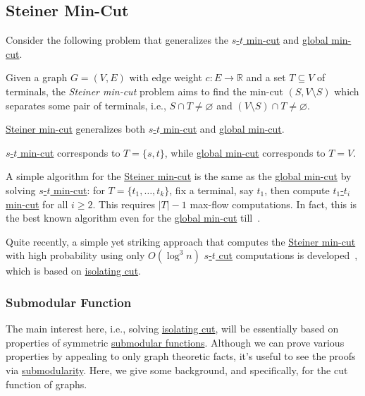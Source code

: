 \subsection{Steiner Min-Cut}
Consider the following problem that generalizes the \hyperref[prb:s-t-min-cut]{\(s\)-\(t\) min-cut} and \hyperref[prb:global-min-cut]{global min-cut}.

\begin{problem}\label{prb:Steiner-min-cut}
Given a graph \(G = (V, E)\) with edge weight \(c \colon E \to \mathbb{R} \) and a set \(T \subseteq V\) of terminals, the \emph{Steiner min-cut} problem aims to find the min-cut \((S, V\setminus S)\) which separates some pair of terminals, i.e., \(S \cap T \neq \varnothing \) and \((V \setminus S) \cap T \neq \varnothing \).
\end{problem}

\begin{remark}
	\hyperref[prb:Steiner-min-cut]{Steiner min-cut} generalizes both \hyperref[prb:s-t-min-cut]{\(s\)-\(t\) min-cut} and \hyperref[prb:global-min-cut]{global min-cut}.
\end{remark}
\begin{explanation}
	\hyperref[prb:s-t-min-cut]{\(s\)-\(t\) min-cut} corresponds to \(T = \{ s, t \} \), while \hyperref[prb:global-min-cut]{global min-cut} corresponds to \(T = V\).
\end{explanation}

A simple algorithm for the \hyperref[prb:Steiner-min-cut]{Steiner min-cut} is the same as the \hyperref[prb:global-min-cut]{global min-cut} by solving \hyperref[prb:s-t-min-cut]{\(s\)-\(t\) min-cut}: for \(T = \{ t_1, \dots , t_k \} \), fix a terminal, say \(t_1\), then compute \hyperref[prb:s-t-min-cut]{\(t_1\)-\(t_i\) min-cut} for all \(i \geq 2\). This requires \(\lvert T \rvert - 1\) max-flow computations. In fact, this is the best known algorithm even for the \hyperref[prb:global-min-cut]{global min-cut} till~\cite{nagamochi1992computing}.

Quite recently, a simple yet striking approach that computes the \hyperref[prb:Steiner-min-cut]{Steiner min-cut} with high probability using only \(O(\log ^3 n)\) \hyperref[prb:s-t-min-cut]{\(s\)-\(t\) cut} computations is developed~\cite{li2020deterministic}, which is based on \hyperref[prb:isolating-cut]{isolating cut}.

\subsubsection{Submodular Function}
The main interest here, i.e., solving \hyperref[prb:isolating-cut]{isolating cut}, will be essentially based on properties of symmetric \hyperref[def:submodular]{submodular functions}. Although we can prove various properties by appealing to only graph theoretic facts, it's useful to see the proofs via \hyperref[def:submodular]{submodularity}. Here, we give some background, and specifically, for the cut function of graphs.

